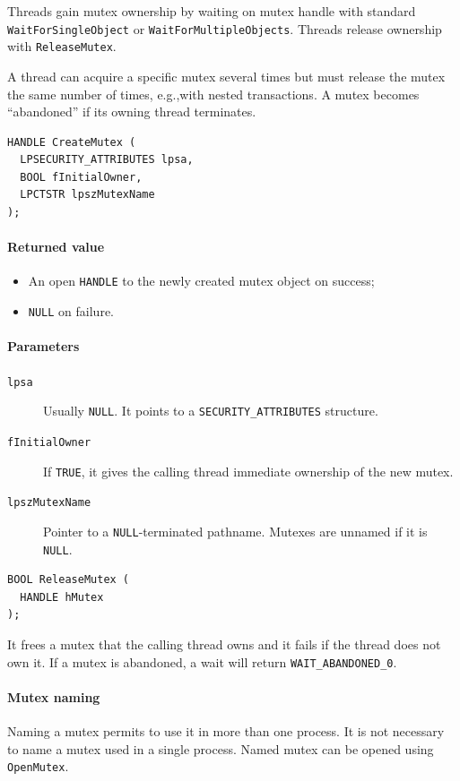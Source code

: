 Threads gain mutex ownership by waiting on mutex handle with standard \texttt{WaitForSingleObject} or \texttt{WaitForMultipleObjects}. Threads release ownership with \texttt{ReleaseMutex}.

A thread can acquire a specific mutex several times but must release the mutex the same number of times, e.g.,\@ with nested transactions. A mutex becomes ``abandoned'' if its owning thread terminates.

\begin{verbatim}
HANDLE CreateMutex (
  LPSECURITY_ATTRIBUTES lpsa,
  BOOL fInitialOwner,
  LPCTSTR lpszMutexName
);
\end{verbatim}

\paragraph{Returned value}
\begin{itemize}
\item An open \texttt{HANDLE} to the newly created mutex object on success;
\item \texttt{NULL} on failure.
\end{itemize}

\paragraph{Parameters}
\begin{description}
\item [\texttt{lpsa}] Usually \texttt{NULL}. It points to a \texttt{SECURITY\_ATTRIBUTES} structure.
\item [\texttt{fInitialOwner}] If \texttt{TRUE}, it gives the calling thread immediate ownership of the new mutex.
\item [\texttt{lpszMutexName}] Pointer to a \texttt{NULL}-terminated pathname. Mutexes are unnamed if it is \texttt{NULL}.
\end{description}

\begin{verbatim}
BOOL ReleaseMutex (
  HANDLE hMutex
);
\end{verbatim}

It frees a mutex that the calling thread owns and it fails if the thread does not own it. If a mutex is abandoned, a wait will return \texttt{WAIT\_ABANDONED\_0}.

\paragraph{Mutex naming}
Naming a mutex permits to use it in more than one process. It is not necessary to name a mutex used in a single process. Named mutex can be opened using \texttt{OpenMutex}.

